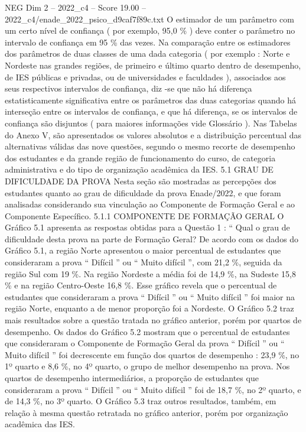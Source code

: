 \begin{textsample}{NEG Dim 2 – 2022\_c4 – Score 19.00 – 2022\_c4/enade\_2022\_psico\_d9caf7f89c.txt}
O estimador de um parâmetro com um certo nível de confiança ( por exemplo, 95,0 \% ) deve conter o parâmetro no intervalo de confiança em 95 \% das vezes.
Na comparação entre os estimadores dos parâmetros de duas classes de uma dada categoria ( por exemplo : Norte e Nordeste nas grandes regiões, de primeiro e último quarto dentro de desempenho, de IES públicas e privadas, ou de universidades e faculdades ), associados aos seus respectivos intervalos de confiança, diz -se que não há diferença estatisticamente significativa entre os parâmetros das duas categorias quando há interseção entre os intervalos de confiança, e que há diferença, se os intervalos de confiança são disjuntos ( para maiores informações vide Glossário ).
Nas Tabelas do Anexo V, são apresentados os valores absolutos e a distribuição percentual das alternativas válidas das nove questões, segundo o mesmo recorte de desempenho dos estudantes e da grande região de funcionamento do curso, de categoria administrativa e do tipo de organização acadêmica da IES. 5.1 GRAU DE DIFICULDADE DA PROVA Nesta seção são mostradas as percepções dos estudantes quanto ao grau de dificuldade da prova Enade/2022, e que foram analisadas considerando sua vinculação ao Componente de Formação Geral e ao Componente Específico. 5.1.1 COMPONENTE DE FORMAÇÃO GERAL O Gráfico 5.1 apresenta as respostas obtidas para a Questão 1 : “ Qual o grau de dificuldade desta prova na parte de Formação Geral?
De acordo com os dados do Gráfico 5.1, a região Norte apresentou o maior percentual de estudantes que consideraram a prova “ Difícil ” ou “ Muito difícil ”, com 21,2 \%, seguida da região Sul com 19 \%.
Na região Nordeste a média foi de 14,9 \%, na Sudeste 15,8 \% e na região Centro-Oeste 16,8 \%.
Esse gráfico revela que o percentual de estudantes que consideraram a prova “ Difícil ” ou “ Muito difícil ” foi maior na região Norte, enquanto a de menor proporção foi a Nordeste.
O Gráfico 5.2 traz mais resultados sobre a questão tratada no gráfico anterior, porém por quartos de desempenho.
Os dados do Gráfico 5.2 mostram que o percentual de estudantes que consideraram o Componente de Formação Geral da prova “ Difícil ” ou “ Muito difícil ” foi decrescente em função dos quartos de desempenho : 23,9 \%, no 1º quarto e 8,6 \%, no 4º quarto, o grupo de melhor desempenho na prova.
Nos quartos de desempenho intermediários, a proporção de estudantes que consideraram a prova “ Difícil ” ou “ Muito difícil ” foi de 18,7 \%, no 2º quarto, e de 14,3 \%, no 3º quarto.
O Gráfico 5.3 traz outros resultados, também, em relação à mesma questão retratada no gráfico anterior, porém por organização acadêmica das IES.

\end{textsample}
